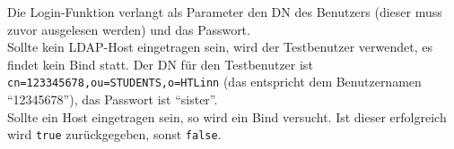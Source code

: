 
Die Login-Funktion verlangt als Parameter den DN des Benutzers (dieser muss zuvor ausgelesen werden) und das Passwort.\\
Sollte kein LDAP-Host eingetragen sein, wird der Testbenutzer verwendet, es findet kein Bind statt. Der DN für den Testbenutzer ist \texttt{cn=123345678,ou=STUDENTS,o=HTLinn} (das entspricht dem Benutzernamen \enquote{12345678}), das Passwort ist \enquote{sister}.\\
Sollte ein Host eingetragen sein, so wird ein Bind versucht. Ist dieser erfolgreich wird \texttt{true} zurückgegeben, sonst \texttt{false}.